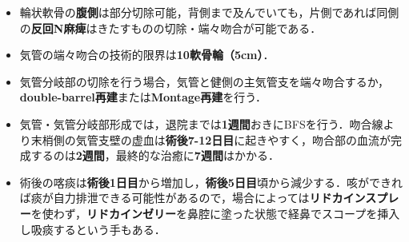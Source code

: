 \begin{itemize}

\item 輪状軟骨の\textbf{腹側}は部分切除可能，背側まで及んでいても，片側であれば同側の\textbf{反回N麻痺}はきたすものの切除・端々吻合が可能である．
\item 気管の端々吻合の技術的限界は\textbf{10軟骨輪（5cm）}．
\item 気管分岐部の切除を行う場合，気管と健側の主気管支を端々吻合するか，\textbf{double-barrel再建}または\textbf{Montage再建}を行う．
\item 気管・気管分岐部形成では，退院までは\textbf{1週間}おきにBFSを行う．吻合線より末梢側の気管支壁の虚血は\textbf{術後7-12日目}に起きやすく，吻合部の血流が完成するのは\textbf{2週間}，最終的な治癒に\textbf{7週間}はかかる．
\item 術後の喀痰は\textbf{術後1日目}から増加し，\textbf{術後5日目}頃から減少する．咳ができれば痰が自力排泄できる可能性があるので，場合によっては\textbf{リドカインスプレー}を使わず，\textbf{リドカインゼリー}を鼻腔に塗った状態で経鼻でスコープを挿入し吸痰するという手もある．

\end{itemize}



